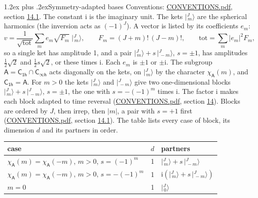 \documentclass[10pt,a4paper]{article}
\makeatletter
\renewcommand\section{\@startsection{section}{1}{\z@}{-3ex plus -1ex minus -.2ex}%
  {1.2ex plus .2ex}{\normalfont\large\sffamily\bfseries\color{parttitle}}}
\numberwithin{equation}{section}
\newcommand{\grp}[1]{\mathsf{#1}}
\newcommand{\iunit}{\mathrm{i}}
\newcommand{\chiA}{\chi_{\grp{A}}}
\newcommand{\jm}[2]{\bigl\lvert{}^{#1}_{\,#2}\bigr\rangle}
\makeatother
\begin{document}
\section{Symmetry-adapted bases}\label{s:bases}
Conventions: \href{../../CONVENTIONS.pdf}{CONVENTIONS.pdf}, section \href{../../CONVENTIONS.pdf\#conv.14.1}{14.1}.
The constant $\iunit$ is the imaginary unit.
\leavevmode\label{n:index.m}\label{n:vector.ket}The kets $\jm{J}{m}$ are the spherical harmonics (the inversion acts as $(-1)^J$). \label{n:index.ketcoefficient}\label{n:vector.basis.symmetry}\label{n:index.ketweight}\label{n:index.total}A vector is listed by its coefficients $e_m$:
\begin{equation}\label{e:ket}v = \frac{1}{\sqrt{\mathrm{tot}}}\sum_m e_m\sqrt{F_m}\;\jm{J}{m},\qquad F_m = (J+m)!\,(J-m)!,\qquad \mathrm{tot} = \sum_m |e_m|^2F_m,\end{equation}
\leavevmode\label{n:index.pair.sign}so a single ket has amplitude 1, and a pair $\jm{J}{m} + s\,\jm{J}{-m}$, $s = \pm1$, has amplitudes $\tfrac{1}{2}\sqrt{2}$ and $\tfrac{1}{2}s\sqrt{2}$, or these times $\iunit$. Each $e_m$ is $\pm1$ or $\pm\iunit$.
\leavevmode\label{n:group.A}\label{n:function.character.abelian}The subgroup $\grp{A} = \grp{C_{1h}}\cap\grp{C_{\infty h}}$ acts diagonally on the kets, on $\jm{J}{m}$ by the character $\chiA(m)$, and $\grp{C_{1h}} = \grp{A}$. For $m > 0$ the kets $\jm{J}{m}$ and $\jm{J}{-m}$ give two one-dimensional blocks $\jm{J}{m} + s\,\jm{J}{-m}$, $s = \pm1$, the one with $s = -(-1)^m$ times $\iunit$. The factor $\iunit$ makes each block adapted to time reversal (\href{../../CONVENTIONS.pdf}{CONVENTIONS.pdf}, section \href{../../CONVENTIONS.pdf\#conv.14}{14}). Blocks are ordered by $J$, then irrep, then $|m|$, a pair with $s = +1$ first (\href{../../CONVENTIONS.pdf}{CONVENTIONS.pdf}, section \href{../../CONVENTIONS.pdf\#conv.14.1}{14.1}).
\leavevmode\label{n:head.case}\label{n:head.partners}The table lists every case of block, its dimension $d$ and its partners in order.
\begin{center}\begin{tabular}{@{}lrl@{}}\toprule
case & $d$ & partners\\\midrule
$\chiA(m) = \chiA(-m)$, $m > 0$, $s = (-1)^m$ & 1 & $\jm{J}{m} + s\,\jm{J}{-m}$\\
$\chiA(m) = \chiA(-m)$, $m > 0$, $s = -(-1)^m$ & 1 & $\iunit(\jm{J}{m} + s\,\jm{J}{-m})$\\
$m = 0$ & 1 & $\jm{J}{0}$\\
\bottomrule\end{tabular}\end{center}
\end{document}
